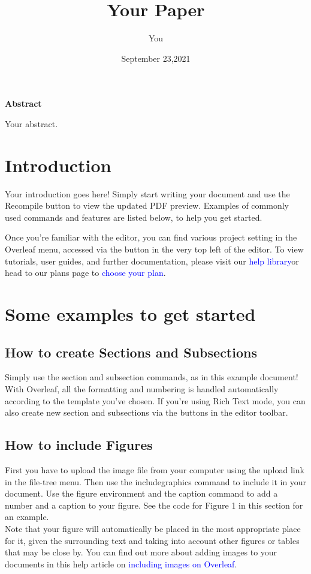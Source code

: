 \documentclass{article}
\title{Your Paper\vspace{0.2cm}}
\author{You}
\date{September 23,2021}
\begin{document}
	
	\maketitle
 
    \begin{center}
   	\textbf{Abstract}
	\end{center}
         \hspace{1.5cm}       Your abstract.
	\section{Introduction}
	Your introduction goes here! Simply start writing your document and use the Recompile button to
	view the updated PDF preview. Examples of commonly used commands and features are listed below,
	to help you get started.
	
	Once you’re familiar with the editor, you can find various project setting in the Overleaf menu,
	accessed via the button in the very top left of the editor. To view tutorials, user guides, and further
	documentation, please visit our 
\textcolor{blue}{help library}or head to our plans page to \textcolor{blue}{choose your plan}.
	\section{Some examples to get started}
	\subsection{How to create Sections and Subsections}
	Simply use the section and subsection commands, as in this example document! With Overleaf, all
	the formatting and numbering is handled automatically according to the template you’ve chosen. If
	you’re using Rich Text mode, you can also create new section and subsections via the buttons in the
	editor toolbar.
	\subsection{How to include Figures}
	First you have to upload the image file from your computer using the upload link in the file-tree menu.
	Then use the includegraphics command to include it in your document. Use the figure environment
	and the caption command to add a number and a caption to your figure. See the code for Figure 1 in
	this section for an example.
	\\
	Note that your figure will automatically be placed in the most appropriate place for it, given the
	surrounding text and taking into account other figures or tables that may be close by. You can find
	out more about adding images to your documents in this help article on  \textcolor{blue}{including images on Overleaf}.
\end{document}
